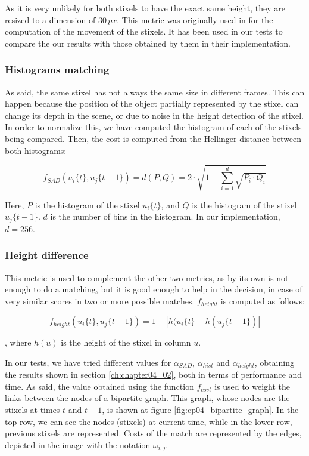 As it is very unlikely for both stixels to have the exact same height, they are resized to a dimension of $30\,px$. This metric was originally used in \cite{gunyel2012stixels} for the computation of the movement of the stixels. It has been used in our tests to compare the our results with those obtained by them in their implementation.

\subsubsection{Histograms matching}\label{ch:chapter04_01_03_01_02}

As said, the same stixel has not always the same size in different frames. This can happen because the position of the object partially represented by the stixel can change its depth in the scene, or due to noise in the height detection of the stixel. In order to normalize this, we have computed the histogram of each of the stixels being compared. Then, the cost is computed from the Hellinger distance between both histograms:

\begin{equation}\label{eq:cp04_stixel_movement_histograms_cost}
f_{SAD}(u_i\{t\}, u_j\{t - 1\}) = d(P, Q) = 2 \cdot \sqrt { 1 - \underset{i=1}{\overset{d}{\sum}}\sqrt{P_i \cdot Q_i}}
\end{equation}

Here, $P$ is the histogram of the stixel $u_i\{t\}$, and $Q$ is the histogram of the stixel $u_j\{t - 1\}$. $d$ is the number of bins in the histogram. In our implementation, $d = 256$.

\subsubsection{Height difference}\label{ch:chapter04_01_03_01_05}

This metric is used to complement the other two metrics, as by its own is not enough to do a matching, but it is good enough to help in the decision, in case of very similar scores in two or more possible matches. $f_{height}$ is computed as follows:

\begin{equation}\label{eq:cp04_stixel_movement_height_cost}
f_{height}(u_i\{t\}, u_j\{t - 1\}) = 1 - |h(u_i\{t\} - h(u_j\{t - 1\})|
\end{equation}

, where $h(u)$ is the height of the stixel in column $u$. 

In our tests, we have tried different values for $\alpha_{SAD}$, $\alpha_{hist}$ and $\alpha_{height}$, obtaining the results shown in section \ref{ch:chapter04_02}, both in terms of performance and time. As said, the value obtained using the function $f_{cost}$ is used to weight the links between the nodes of a bipartite graph. This graph, whose nodes are the stixels at times $t$ and $t - 1$, is shown at figure \ref{fig:cp04_bipartite_graph}. In the top row, we can see the nodes (stixels) at current time, while in the lower row, previous stixels are represented. Costs of the match are represented by the edges, depicted in the image with the notation $\omega_{i,j}$.

